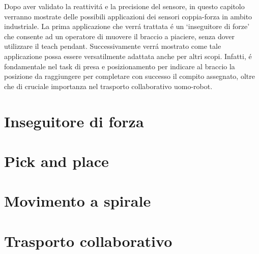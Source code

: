 Dopo aver validato la reattivit\'{a} e la precisione del sensore, in questo capitolo verranno mostrate delle possibili applicazioni 
dei sensori coppia-forza in ambito industriale. 
La prima applicazione che verr\'{a} trattata \'{e} un `inseguitore di forze' che consente ad un operatore di muovere il braccio 
a piaciere, senza dover utilizzare 
il teach pendant. Successivamente verr\'{a} mostrato come tale applicazione possa essere versatilmente adattata anche per altri scopi. 
Infatti, \'{e} fondamentale nel task di presa e posizionamento per indicare al braccio la posizione da raggiungere per completare 
con successo il compito assegnato, oltre che di cruciale importanza nel trasporto collaborativo uomo-robot. 

\section{Inseguitore di forza} \label{sec:force_follower}


\section{Pick and place} \label{sec:pick_place}


\section{Movimento a spirale}


\section{Trasporto collaborativo}

